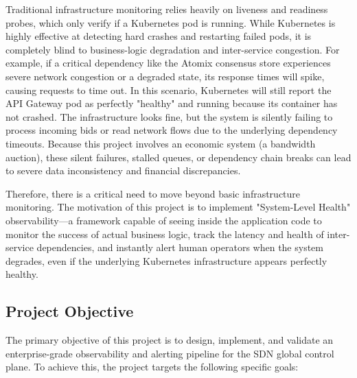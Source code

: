 \documentclass[11pt, a4paper]{article}
\begin{document}
Traditional infrastructure monitoring relies heavily on liveness and readiness probes, which only verify if a Kubernetes pod is running. While Kubernetes is highly effective at detecting hard crashes and restarting failed pods, it is completely blind to business-logic degradation and inter-service congestion. For example, if a critical dependency like the Atomix consensus store experiences severe network congestion or a degraded state, its response times will spike, causing requests to time out. In this scenario, Kubernetes will still report the API Gateway pod as perfectly "healthy" and running because its container has not crashed. The infrastructure looks fine, but the system is silently failing to process incoming bids or read network flows due to the underlying dependency timeouts. Because this project involves an economic system (a bandwidth auction), these silent failures, stalled queues, or dependency chain breaks can lead to severe data inconsistency and financial discrepancies.

Therefore, there is a critical need to move beyond basic infrastructure monitoring. The motivation of this project is to implement "System-Level Health" observability—a framework capable of seeing inside the application code to monitor the success of actual business logic, track the latency and health of inter-service dependencies, and instantly alert human operators when the system degrades, even if the underlying Kubernetes infrastructure appears perfectly healthy.

\subsection{Project Objective}
The primary objective of this project is to design, implement, and validate an enterprise-grade observability and alerting pipeline for the SDN global control plane. To achieve this, the project targets the following specific goals:
\end{document}
